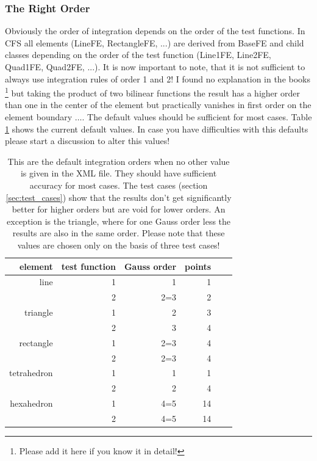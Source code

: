 \subsubsection{The Right Order}
Obviously the order of integration depends on the order of the test functions.
In CFS  all elements (LineFE,  RectangleFE, ...)  are derived from  BaseFE and
child classes depending  on the order of the test  function (Line1FE, Line2FE,
Quad1FE, Quad2FE, ...). It is now important to note, that it is not sufficient
to always use  integration rules of order  1 and 2! I found  no explanation in
the books \footnote{Please add  it here if you know it  in detail!} but taking
the product of two  bilinear functions the result has a  higher order than one
in the center  of the element but  practically vanishes in first  order on the
element boundary  $\ldots$. The default  values should be sufficient  for most
cases. Table \ref{tab:default_order} shows the current default values. In case
you have  difficulties with this defaults  please start a discussion  to alter
this values!

\begin{table}
\begin{center}
\begin{tabular}{r|r|r|r|r|r}
element & test function & Gauss order & points \\
\hline
line & 1 & 1 & 1\\
     & 2 & 2=3 & 2 \\
triangle & 1 & 2 & 3 \\
         & 2 & 3 & 4 \\
rectangle & 1 & 2=3 & 4 \\
          & 2 & 2=3 & 4 \\
tetrahedron & 1 & 1 & 1 \\
         & 2 & 2 & 4 \\
hexahedron & 1 & 4=5 & 14 \\
         & 2 & 4=5 & 14 \\
\end{tabular}
\caption{This are the default integration orders  when no other value is given
  in the  XML file. They should  have sufficient accuracy for  most cases. The
  test cases  (section \ref{sec:test_cases}) show  that the results  don't get
  significantly better  for higher orders  but are  void for lower  orders. An
  exception is  the triangle, where for  one Gauss order less  the results are
  also in the same order. Please note that these values are chosen only on the
  basis of three test cases!}
\label{tab:default_order}
\end{center}
\end{table}

